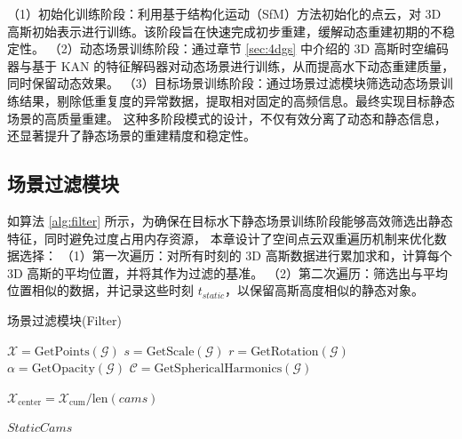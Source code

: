 （1）初始化训练阶段：利用基于结构化运动（SfM）方法\cite{sfm1}\cite{sfm2}初始化的点云，对 3D 高斯初始表示进行训练。该阶段旨在快速完成初步重建，缓解动态重建初期的不稳定性。
（2）动态场景训练阶段：通过章节 \ref{sec:4dgs} 中介绍的 3D 高斯时空编码器与基于 KAN 的特征解码器对动态场景进行训练，从而提高水下动态重建质量，同时保留动态效果。
（3）目标场景训练阶段：通过场景过滤模块筛选动态场景训练结果，剔除低重复度的异常数据，提取相对固定的高频信息。最终实现目标静态场景的高质量重建。
这种多阶段模式的设计，不仅有效分离了动态和静态信息，还显著提升了静态场景的重建精度和稳定性。

\subsection{场景过滤模块}
如算法 \ref{alg:filter} 所示，为确保在目标水下静态场景训练阶段能够高效筛选出静态特征，同时避免过度占用内存资源，
本章设计了空间点云双重遍历机制来优化数据选择：
（1）第一次遍历：对所有时刻的 3D 高斯数据进行累加求和，计算每个 3D 高斯的平均位置，并将其作为过滤的基准。
（2）第二次遍历：筛选出与平均位置相似的数据，并记录这些时刻 $t_{static}$，以保留高斯高度相似的静态对象。
\begin{algorithm}[t]
    \caption{\label{alg:filter}场景过滤模块(Filter)}
    
    $\mathcal{X} = \text{GetPoints}(\mathcal{G})$
    $s = \text{GetScale}(\mathcal{G})$
    $r = \text{GetRotation}(\mathcal{G})$
    $\alpha = \text{GetOpacity}(\mathcal{G})$
    $\mathcal{C} = \text{GetSphericalHarmonics}(\mathcal{G})$
    
    $\mathcal{X}_{\text{center}} = \mathcal{X}_{\text{cum}} / \text{len}(cams)$
    
    \Return $StaticCams$
\end{algorithm}

